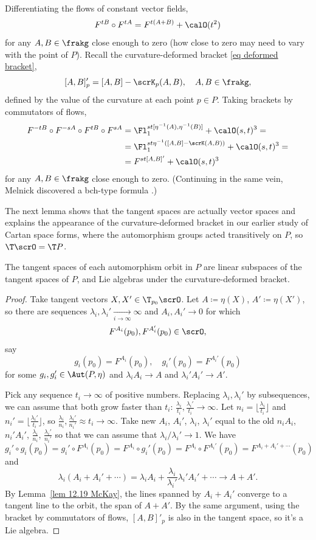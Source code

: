 Differentiating the flows of constant vector fields, 
\[F^{tB}\circ F^{tA}=F^{t(A+B)}+\calO(t^2)\]
for any $A,B\in\frakg$ close enough to zero (how close to zero may need to vary with the point of $P$). Recall the curvature-deformed bracket \eqref{eq deformed bracket},
\[[A,B]_p'=[A,B]-\scrK_p(A,B),\quad A,B\in\frakg,\]
defined by the value of the curvature at each point $p\in P$. Taking brackets by commutators of flows,
\begin{align}
    F^{-tB}\circ F^{-sA}\circ F^{tB}\circ F^{sA}&=\Fl^{st[\eta^{-1}(A),\eta^{-1}(B)]}_1+\calO(s,t)^3=\notag\\
    &= \Fl_1^{st\eta^{-1}([A,B]-\scrK(A,B))}+\calO(s,t)^3=\notag\\
    &=F^{st[A,B]'}+\calO(s,t)^3
\end{align}
for any $A,B\in\frakg$ close enough to zero. (Continuing in the same vein, Melnick discovered a \gls{bch}-type formula \cite{Melnick}.)

The next lemma shows that the tangent spaces are actually vector spaces and explains the appearance of the curvature-deformed bracket in our earlier study of Cartan space forms, where the automorphism groups acted transitively on $P$, so $\T \scrO=\T P$.


\begin{lem}
    The tangent spaces of each automorphism orbit in $P$ are linear subspaces of the tangent spaces of $P$, and Lie algebras under the curvature-deformed bracket.
\end{lem}
\begin{proof}
    Take tangent vectors $X,X'\in\T_{p_0}\scrO$. Let $A\coloneqq \eta(X)$, $A'\coloneqq \eta(X')$, so there are sequences $\lambda_i,\lambda_i'\underset{i\to\infty}{\to}\infty$ and $A_i,A_i'\to 0$ for which 
    \[F^{A_i}(p_0),F^{A_i'}(p_0)\in\scrO,\]
    say 
    \[g_i(p_0)=F^{A_i}(p_0),\quad g_i'(p_0)=F^{A_i'}(p_0)\]
    for some $g_i,g_i'\in\Aut(P,\eta)$ and $\lambda_iA_i\to A$ and $\lambda_i'A_i'\to A'$.

    Pick any sequence $t_i\to \infty$ of positive numbers. Replacing $\lambda_i,\lambda_i'$ by subsequences, we can assume that both grow faster than $t_i$: $\frac{\lambda_i}{t_i},\frac{\lambda_i'}{t_i}\to \infty$. Let $n_i=\lfloor\frac{\lambda_i}{t_i}\rfloor $ and $n_i'=\lfloor\frac{\lambda_i'}{t_i}\rfloor$, so $\frac{\lambda_i}{n_i},\frac{\lambda_i'}{n_i'}\approx t_i\to \infty$. Take new $A_i$, $A_i'$, $\lambda_i$, $\lambda_i'$ equal to the old $n_iA_i$, $n_i'A_i'$, $\frac{\lambda_i}{n_i}$, $\frac{\lambda_i'}{n_i'}$ so that we can assume that $\lambda_i/\lambda_i'\to 1$. We have 
    \[g_i'\circ g_i(p_0) = g_i'\circ F^{A_i}(p_0)=F^{A_i}\circ g_i'(p_0)=F^{A_i}\circ F^{A_i'}(p_0)=F^{A_i+A_i'+\cdots}(p_0)\]
    and 
    \[\lambda_i(A_i+A_i'+\cdots )=\lambda_i A_i+\frac{\lambda_i}{\lambda_i'}\lambda_i'A_i'+\cdots\to A+A'.\]
    By Lemma~\ref{lem 12.19 McKay}, the lines spanned by $A_i+A_i'$ converge to a tangent line to the orbit, the span of $A+A'$. By the same argument, using the bracket by commutators of flows, $[A,B]'_p$ is also in the tangent space, so it's a Lie algebra.
\end{proof}

